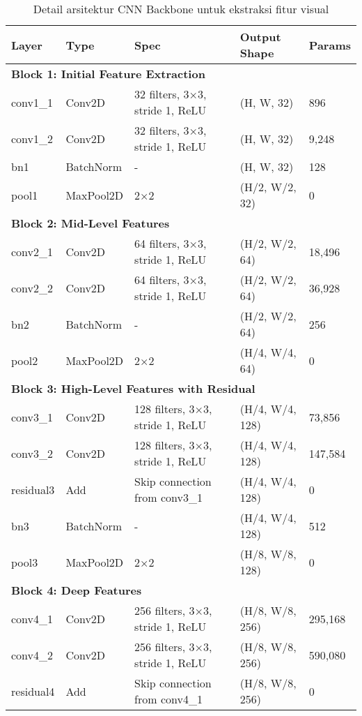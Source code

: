 \documentclass[12pt,a4paper]{article}
\begin{document}
\begin{table}[H]
\centering
\caption{Detail arsitektur CNN Backbone untuk ekstraksi fitur visual}
\label{tab:appendix-cnn-detailed}
\small
\begin{tabular}{|l|l|l|l|l|}
\hline
\textbf{Layer} & \textbf{Type} & \textbf{Spec} & \textbf{Output Shape} & \textbf{Params} \\ \hline
\multicolumn{5}{|l|}{\textbf{Block 1: Initial Feature Extraction}} \\ \hline
conv1\_1 & Conv2D & 32 filters, 3×3, stride 1, ReLU & (H, W, 32) & 896 \\ \hline
conv1\_2 & Conv2D & 32 filters, 3×3, stride 1, ReLU & (H, W, 32) & 9,248 \\ \hline
bn1 & BatchNorm & - & (H, W, 32) & 128 \\ \hline
pool1 & MaxPool2D & 2×2 & (H/2, W/2, 32) & 0 \\ \hline
\multicolumn{5}{|l|}{\textbf{Block 2: Mid-Level Features}} \\ \hline
conv2\_1 & Conv2D & 64 filters, 3×3, stride 1, ReLU & (H/2, W/2, 64) & 18,496 \\ \hline
conv2\_2 & Conv2D & 64 filters, 3×3, stride 1, ReLU & (H/2, W/2, 64) & 36,928 \\ \hline
bn2 & BatchNorm & - & (H/2, W/2, 64) & 256 \\ \hline
pool2 & MaxPool2D & 2×2 & (H/4, W/4, 64) & 0 \\ \hline
\multicolumn{5}{|l|}{\textbf{Block 3: High-Level Features with Residual}} \\ \hline
conv3\_1 & Conv2D & 128 filters, 3×3, stride 1, ReLU & (H/4, W/4, 128) & 73,856 \\ \hline
conv3\_2 & Conv2D & 128 filters, 3×3, stride 1, ReLU & (H/4, W/4, 128) & 147,584 \\ \hline
residual3 & Add & Skip connection from conv3\_1 & (H/4, W/4, 128) & 0 \\ \hline
bn3 & BatchNorm & - & (H/4, W/4, 128) & 512 \\ \hline
pool3 & MaxPool2D & 2×2 & (H/8, W/8, 128) & 0 \\ \hline
\multicolumn{5}{|l|}{\textbf{Block 4: Deep Features}} \\ \hline
conv4\_1 & Conv2D & 256 filters, 3×3, stride 1, ReLU & (H/8, W/8, 256) & 295,168 \\ \hline
conv4\_2 & Conv2D & 256 filters, 3×3, stride 1, ReLU & (H/8, W/8, 256) & 590,080 \\ \hline
residual4 & Add & Skip connection from conv4\_1 & (H/8, W/8, 256) & 0 \\ \hline

\end{tabular}
\end{table}
\end{document}
